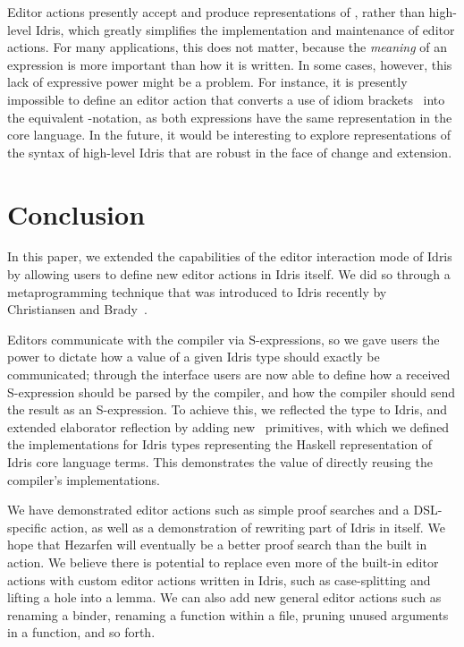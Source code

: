 Editor actions presently accept and produce representations of \TT{},
rather than high-level Idris, which greatly simplifies the
implementation and maintenance of editor actions. For many
applications, this does not matter, because the \emph{meaning} of an
expression is more important than how it is written. In some cases,
however, this lack of expressive power might be a problem. For
instance, it is presently impossible to define an editor action that
converts a use of idiom brackets~\citep{Applicative} into the
equivalent -notation, as both expressions have the same
representation in the core language. In the future, it would be
interesting to explore representations of the syntax of high-level
Idris that are robust in the face of change and extension.



\section{Conclusion}\label{sec:conclusion}

In this paper, we extended the capabilities of the editor interaction mode of
Idris by allowing users to define new editor actions in Idris itself. We did
so through a metaprogramming technique that was introduced to Idris recently by
Christiansen and Brady~\cite{elabref}.

Editors communicate with the compiler via S-expressions, so we gave
users the power to dictate how a value of a given Idris type should
exactly be communicated; through the  interface users
are now able to define how a received S-expression should be parsed by
the compiler, and how the compiler should send the result as an
S-expression. To achieve this, we reflected the  type to
Idris, and extended elaborator reflection by adding new \Elab\
primitives, with which we defined the  implementations
for Idris types representing the Haskell representation of Idris core
language terms. This demonstrates the value of directly reusing the
compiler's implementations.

We have demonstrated editor actions such as simple proof searches and
a DSL-specific action, as well as a demonstration of rewriting part of
Idris in itself. We hope that Hezarfen will eventually be a better
proof search than the built in action. We believe there is potential
to replace even more of the built-in editor actions with custom editor
actions written in Idris, such as case-splitting and lifting a hole
into a lemma. We can also add new general editor actions such as
renaming a binder, renaming a function within a file, pruning unused
arguments in a function, and so forth.

